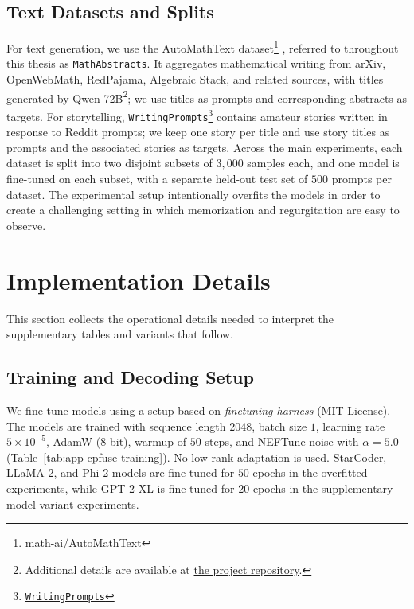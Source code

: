 \subsection{Text Datasets and Splits}

For text generation, we use the AutoMathText dataset\footnote{\href{https://huggingface.co/datasets/math-ai/AutoMathText}{math-ai/AutoMathText}} \citep{zhang2024autonomous}, referred to throughout this thesis as \texttt{MathAbstracts}. It aggregates mathematical writing from arXiv, OpenWebMath, RedPajama, Algebraic Stack, and related sources, with titles generated by Qwen-72B\footnote{Additional details are available at \href{https://github.com/yifanzhang-pro/AutoMathText}{the project repository}.}; we use titles as prompts and corresponding abstracts as targets. For storytelling, \texttt{WritingPrompts}\footnote{\href{https://huggingface.co/datasets/euclaise/writingprompts}{\texttt{WritingPrompts}}} \citep{fan2018hierarchical} contains amateur stories written in response to Reddit prompts; we keep one story per title and use story titles as prompts and the associated stories as targets. Across the main experiments, each dataset is split into two disjoint subsets of \(3{,}000\) samples each, and one model is fine-tuned on each subset, with a separate held-out test set of \(500\) prompts per dataset. The experimental setup intentionally overfits the models in order to create a challenging setting in which memorization and regurgitation are easy to observe.

\section{Implementation Details}
\label{app:cpfuse-implementation}

This section collects the operational details needed to interpret the supplementary tables and variants that follow.

\subsection{Training and Decoding Setup}

We fine-tune models using a setup based on \emph{finetuning-harness} (MIT License). The models are trained with sequence length \(2048\), batch size \(1\), learning rate \(5 \times 10^{-5}\), AdamW (8-bit), warmup of \(50\) steps, and NEFTune noise \citep{jain2023neftune} with \(\alpha=5.0\) (Table~\ref{tab:app-cpfuse-training}). No low-rank adaptation is used. StarCoder, LLaMA 2, and Phi-2 models are fine-tuned for \(50\) epochs in the overfitted experiments, while GPT-2 XL is fine-tuned for \(20\) epochs in the supplementary model-variant experiments.

